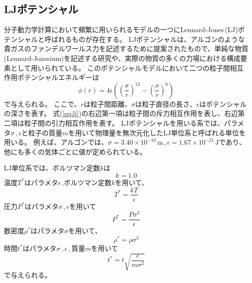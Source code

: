 \documentclass[titlepage]{jsreport}
\begin{document}
\subsection{LJポテンシャル}\label{principle-subsec:LJ}
分子動力学計算において頻繁に用いられるモデルの一つにLennard-Jones\,(LJ)ポテンシャルと呼ばれるものが存在する。
LJポテンシャルは、アルゴンのような貴ガスのファンデルワールス力を記述するために提案された\cite{lennard-jones}もので、単純な物質(Lennard-Jonesium)を記述する研究\cite{lennard-jonesium-1,lennard-jonesium-2}や、実際の物質の多くの力場における構成要素\cite{lennard-jones-force-field-1,lennard-jones-force-field-2, lennard-jones-force-field-3}として用いられている。
このポテンシャルモデルにおいて二つの粒子間相互作用ポテンシャルエネルギーは
\large
\begin{equation}
\phi(r)=4{\epsilon}\left(\left(\frac{\sigma}{r}\right)^{12}-\left(\frac{\sigma}{r}\right)^6\right)\label{eq:lj}
\end{equation}
\normalsize
で与えられる。
ここで、$r$は粒子間距離、${\sigma}$は粒子直径の長さ、${\epsilon}$はポテンシャルの深さを表す。
式(\ref{eq:lj})の右辺第一項は粒子間の斥力相互作用を表し、右辺第二項は粒子間の引力相互作用を表す。
LJポテンシャルを用いる系では、パラメタ$\sigma$\,,\,$\epsilon$と粒子の質量$m$を用いて物理量を無次元化したLJ単位系\cite{lennard-jones-system-of-units}と呼ばれる単位を用いる。
例えば、アルゴンでは、${\sigma}=3.40×10^{-10}\,\mathrm{m}$\,,\,${\epsilon}=1.67×10^{-21}\,\mathrm{J}$であり\cite{lennard-jones-argon-parameters}、
他にも多くの気体ごとに値が定められている\cite{lennard-jones-many-parameters}。

LJ単位系では、ボルツマン定数$k$は
\large
\begin{equation}
k=1.0\label{eq:k}
\end{equation}
\normalsize
温度$T^*$はパラメタ$\epsilon$\,,ボルツマン定数$k$を用いて、
\large
\begin{equation}
T^*=\frac{kT}{\epsilon}\label{eq:T}
\end{equation}
\normalsize
圧力$P^*$はパラメタ${\sigma}$\,,\,${\epsilon}$を用いて
\large
\begin{equation}
P^*=\frac{P\sigma^3}{\epsilon}\label{eq:P}
\end{equation}
\normalsize
数密度$\rho^*$はパラメタ$\sigma$を用いて、
\large
\begin{equation}
\rho^*=\rho{\sigma}^3\label{eq:rho}
\end{equation}
\normalsize
時間$t^*$はパラメタ${\sigma}$\,,\,${\epsilon}$\,,\,質量$m$を用いて
\large
\begin{equation}
t^*=t\sqrt{\frac{\epsilon}{m{\sigma}^2}}\label{eq:time}
\end{equation}
\normalsize
で与えられる。
\end{document}
